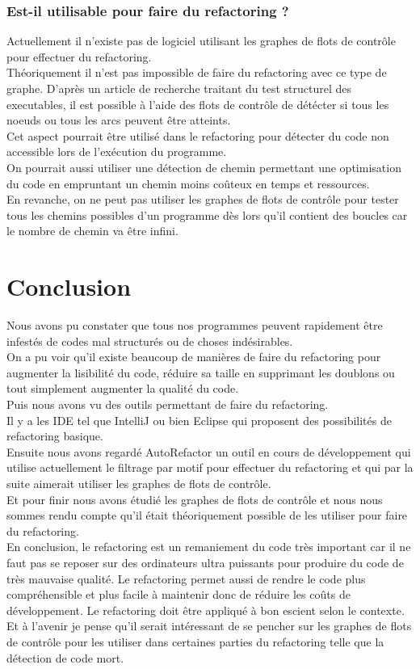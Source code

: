 \documentclass[a4paper,twoside,12pt,openright]{report}
\begin{document}
\subsection{Est-il utilisable pour faire du refactoring ?}
Actuellement il n'existe pas de logiciel utilisant les graphes de flots de contrôle pour effectuer du refactoring.\\
Théoriquement il n'est pas impossible de faire du refactoring avec ce type de graphe.
D'après un article de recherche traitant du test structurel des executables, il est possible à l'aide des flots de contrôle de détécter si tous les noeuds ou tous les arcs peuvent être atteints\cite{ref12}.\\
Cet aspect pourrait être utilisé dans le refactoring pour détecter du code non accessible lors de l'exécution du programme.\\
On pourrait aussi utiliser une détection de chemin
permettant une optimisation du code en empruntant un chemin moins coûteux en temps et ressources.\\
En revanche, on ne peut pas utiliser les graphes de flots de contrôle pour tester tous les chemins possibles d'un programme dès lors qu'il contient des boucles car le nombre de chemin va être infini.\\


\chapter{Conclusion}
Nous avons pu constater que tous nos programmes peuvent rapidement être infestés de codes mal structurés ou de choses indésirables.\\
On a pu voir qu'il existe beaucoup de manières de faire du refactoring pour augmenter la lisibilité du code, réduire sa taille en supprimant les doublons ou tout simplement augmenter la qualité du code.\\
Puis nous avons vu des outils permettant de faire du refactoring.\\
Il y a les IDE tel que IntelliJ ou bien Eclipse qui proposent des possibilités de refactoring basique.\\
Ensuite nous avons regardé AutoRefactor un outil en cours de développement qui utilise actuellement le filtrage par motif pour effectuer du refactoring et qui par la suite aimerait utiliser les graphes de flots de contrôle.\\
Et pour finir nous avons étudié les graphes de flots de contrôle et nous nous sommes rendu compte qu'il était théoriquement possible de les utiliser pour faire du refactoring.\\
En conclusion, le refactoring est un remaniement du code très important car il ne faut pas se reposer sur des ordinateurs ultra puissants pour produire du code de très mauvaise qualité. Le refactoring permet aussi de rendre le code plus compréhensible et plus facile à maintenir donc de réduire les coûts de développement.
Le refactoring doit être appliqué à bon escient selon le contexte.\\
Et à l'avenir je pense qu'il serait intéressant de se pencher sur les graphes de flots de contrôle pour les utiliser dans certaines parties du refactoring telle que la détection de code mort.\\




\end{document}
